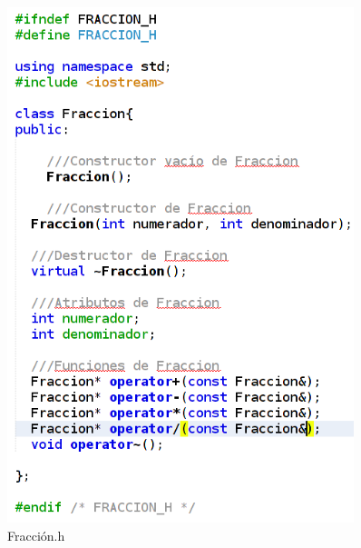 \documentclass[11pt]{article}
\begin{document}
\begin{figure}[H]
\centering
\includegraphics[height=15cm, width=\textwidth]{img/HeaderFraccion.png}
\caption{Fracción.h}
\label{fig:frach}
\end{figure}
\end{document}
